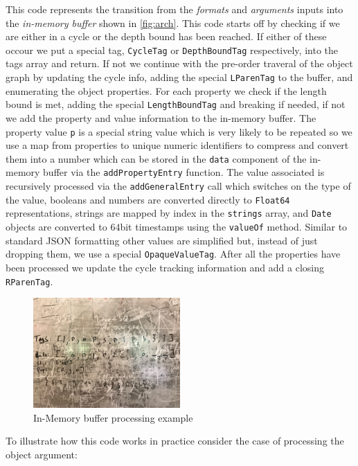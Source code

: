 This code represents the transition from the \emph{formats} and \emph{arguments} 
inputs into the \emph{in-memory buffer} shown in \autoref{fig:arch}. This code 
starts off by checking if we are either in a cycle or the depth bound has been 
reached. If either of these occour we put a special tag, \texttt{CycleTag} or 
\texttt{DepthBoundTag} respectively, into the tags array and return. If not we 
continue with the pre-order traveral of the object graph by updating the cycle 
info, adding the special \texttt{LParenTag} to the buffer, and enumerating the 
object properties. For each property we check if the length bound is met, adding 
the special \texttt{LengthBoundTag} and breaking if needed, if not we add the 
property and value information to the in-memory buffer. The property value \texttt{p} 
is a special string value which is very likely to be repeated so we use a map 
from properties to unique numeric identifiers to compress and convert them into 
a number which can be stored in the \texttt{data} component of the in-memory buffer 
via the \texttt{addPropertyEntry} function. The value associated is recursively 
processed via the \texttt{addGeneralEntry} call which switches on the type of the 
value, booleans and numbers are converted directly to \texttt{Float64} representations, 
strings are mapped by index in the \texttt{strings} array, and \texttt{Date} objects 
are converted to $64$bit timestamps using the \texttt{valueOf} method. Similar to 
standard JSON formatting other values are simplified but, instead of just dropping 
them, we use a special \texttt{OpaqueValueTag}. After all the properties have 
been processed we update the cycle tracking information and add a closing 
\texttt{RParenTag}.

\begin{figure}
    \centering
    \includegraphics[width=0.5\textwidth]{Figures/InMemoryExample}
    \caption{In-Memory buffer processing example}
    \label{fig:inmemory}
\end{figure}

To illustrate how this code works in practice consider the case of processing the 
object argument:


